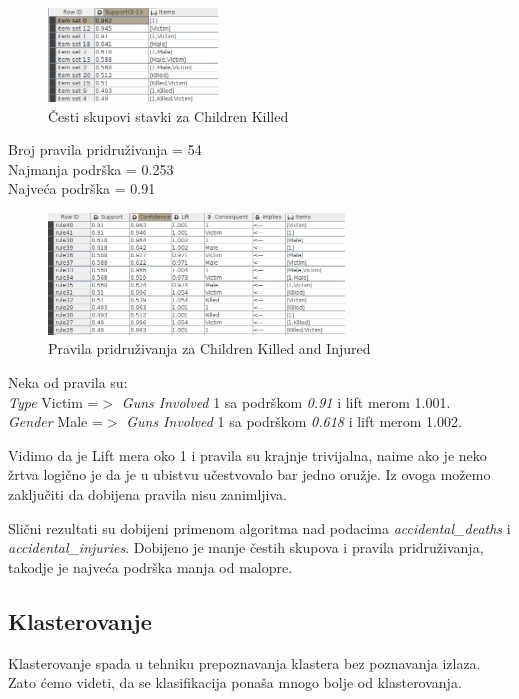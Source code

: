 \documentclass[12pt, a4paper]{article}
\begin{document}
\begin{figure}[H]
\centering
\includegraphics[width=0.4\textwidth]{aprioriAlgorithm_commonSubset_childrenKI.png}
\caption{\v Cesti skupovi stavki za Children Killed}
\end{figure}

Broj pravila pridru\v zivanja = 54\\
Najmanja podr\v ska = 0.253\\
Najve\' ca podr\v ska = 0.91\\

\begin{figure}[H]
\centering
\includegraphics[width=0.7\textwidth]{associationRules_ChildrenKI.png}
\caption{Pravila pridru\v zivanja za Children Killed and Injured}
\end{figure}

Neka od pravila su:\\
	\textit{Type} Victim =$>$ \textit{Guns Involved} 1 sa podr\v skom \textit{0.91} i lift merom 1.001.\\  
	\textit{Gender} Male =$>$ \textit{Guns Involved} 1 sa podr\v skom \textit{0.618} i lift merom 1.002.\break
	
Vidimo da je Lift mera oko 1 i pravila su krajnje trivijalna, naime ako je neko \v zrtva logi\v cno je da je u ubistvu u\v cestvovalo bar jedno oru\v zje. Iz ovoga mo\v zemo 
zaklju\v citi da dobijena pravila nisu zanimljiva.\break
	
Sli\v cni rezultati su dobijeni primenom algoritma nad podacima \textit{accidental\_deaths} i \textit{accidental\_injuries}. Dobijeno je manje \v cestih skupova i pravila pridru\v zivanja, takodje je najve\' ca podr\v ska manja od malopre.

\subsection{Klasterovanje}
Klasterovanje spada u tehniku prepoznavanja klastera bez poznavanja izlaza.
Zato \' cemo videti, da se klasifikacija pona\v sa mnogo bolje od klasterovanja.
\end{document}
